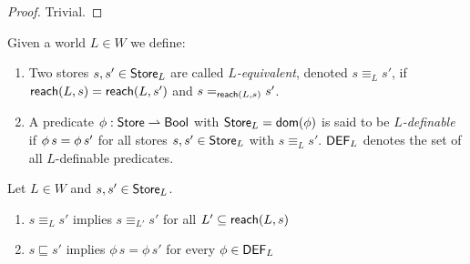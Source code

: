 \documentclass[12pt,a4paper]{report}
\newcommand{\DEF}{\sstyle{DEF}}
\begin{document}
\begin{proof}
  Trivial.
\end{proof}

\begin{definition}
  Given a world $L \in W$ we define:
  \begin{enumerate}
    \item Two stores $s,s'\in\mathsf{Store}_L$ are called {\em $L$-equivalent}, denoted $s \equiv_L s'$, if
          $\mathsf{reach}(L,s) = \mathsf{reach}(L,s')$ and $s =_{\mathsf{reach}(L,s)} s'$.

    \item A predicate $\phi:\mathsf{Store} \rightharpoonup \mathsf{Bool}$ with $\mathsf{Store}_L = \mathsf{dom}(\phi)$ is said to be
          {\em $L$-definable} if $\phi\,s = \phi\,s'$ for all stores
          $s,s'\in\mathsf{Store}_L$ with $s \equiv_L s'$. $\DEF_L$ denotes the set of all $L$-definable
          predicates.
  \end{enumerate}
\end{definition}

\begin{lemma} \label{lemma:L_equivalence_and_L_definability}
  Let $L \in W$ and $s,s' \in \mathsf{Store}_L$.
  \begin{enumerate}
    \item $s \equiv_{L} s'$ implies $s \equiv_{L'} s'$ for all $L' \subseteq \mathsf{reach}(L,s)$
    \item $s \sqsubseteq s'$ implies $\phi\,s = \phi\,s'$ for every $\phi \in \DEF_L$
  \end{enumerate}
\end{lemma}
\end{document}
